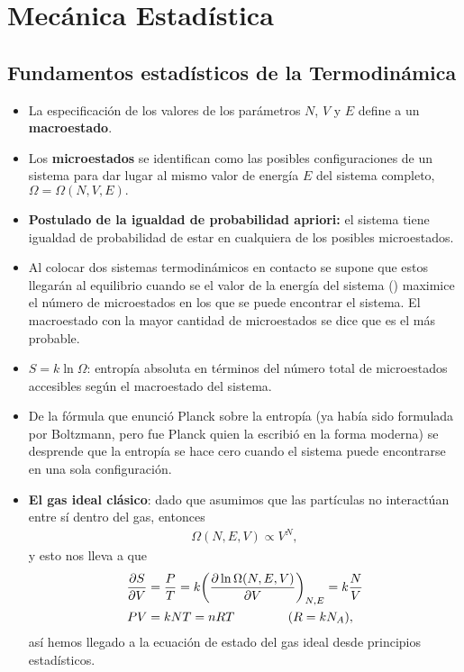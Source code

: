 \chapter{Mecánica Estadística}


\section{Fundamentos estadísticos de la Termodinámica}
\begin{itemize}
	\item La especificación de los valores de los parámetros $N$, $V$ y $E$
	define a un \textbf{macroestado}.
	
	\item Los \textbf{microestados} se identifican como las posibles 
	configuraciones de un sistema para dar lugar al mismo valor 
	de energía $E$ del sistema completo, $\Omega=\Omega(N,V,E).$
	
	\item \textbf{Postulado de la igualdad de probabilidad apriori:} el sistema
	tiene igualdad de probabilidad de estar en cualquiera de los posibles
	microestados.
	
	\item Al colocar dos sistemas termodinámicos en contacto se supone
	que estos llegarán al equilibrio cuando se el valor de la energía
	del sistema () maximice el número 
	de microestados en los que se puede encontrar el sistema.
	El macroestado con la mayor cantidad de microestados 
	se dice que es el más probable.
	
	\item $S=k\ln \Omega$: entropía absoluta en términos del número
	total de microestados accesibles según el macroestado del sistema.
	
	\item De la fórmula que enunció Planck sobre la entropía (ya había
	sido formulada por Boltzmann, pero fue Planck quien la escribió en la
	forma moderna) se desprende que la entropía se hace cero cuando 
	el sistema puede encontrarse en una sola configuración.
	
	\item \textbf{El gas ideal clásico}: dado que asumimos que las 
	partículas no interactúan entre sí dentro del gas, entonces
	\begin{align}
	\Omega (N,E,V)\propto V^N,
	\end{align}
	y esto nos lleva a que 
	\begin{align}
	\pdv{S}{V}&=\frac{P}{T}=k\qty(\pdv{\ln \Omega \qty(N,E,V)}{V})_{N,E}=
	k\frac{N}{V}  \\
	PV&=kNT = nRT \hspace{1.5cm} (R=kN_A),
	\end{align}
	así hemos llegado a la ecuación de estado del gas ideal desde 
	principios estadísticos.
\end{itemize}